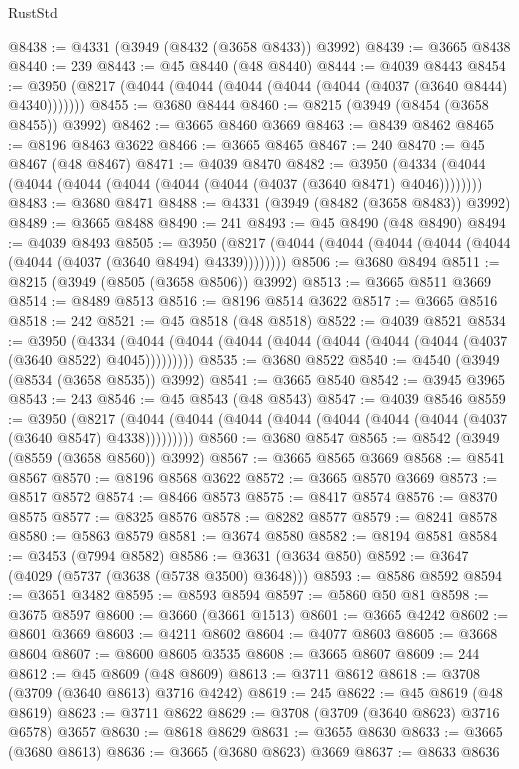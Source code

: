 \begin{lexlean}{RustStd}
\begin{coremodule}
@8438 := @4331 (@3949 (@8432 (@3658 @8433)) @3992)
@8439 := @3665 @8438
@8440 := 239
@8443 := @45 @8440 (@48 @8440)
@8444 := @4039 @8443
@8454 := @3950 (@8217 (@4044 (@4044 (@4044 (@4044 (@4044 (@4037 (@3640 @8444) @4340)))))))
@8455 := @3680 @8444
@8460 := @8215 (@3949 (@8454 (@3658 @8455)) @3992)
@8462 := @3665 @8460 @3669
@8463 := @8439 @8462
@8465 := @8196 @8463 @3622
@8466 := @3665 @8465
@8467 := 240
@8470 := @45 @8467 (@48 @8467)
@8471 := @4039 @8470
@8482 := @3950 (@4334 (@4044 (@4044 (@4044 (@4044 (@4044 (@4044 (@4037 (@3640 @8471) @4046))))))))
@8483 := @3680 @8471
@8488 := @4331 (@3949 (@8482 (@3658 @8483)) @3992)
@8489 := @3665 @8488
@8490 := 241
@8493 := @45 @8490 (@48 @8490)
@8494 := @4039 @8493
@8505 := @3950 (@8217 (@4044 (@4044 (@4044 (@4044 (@4044 (@4044 (@4037 (@3640 @8494) @4339))))))))
@8506 := @3680 @8494
@8511 := @8215 (@3949 (@8505 (@3658 @8506)) @3992)
@8513 := @3665 @8511 @3669
@8514 := @8489 @8513
@8516 := @8196 @8514 @3622
@8517 := @3665 @8516
@8518 := 242
@8521 := @45 @8518 (@48 @8518)
@8522 := @4039 @8521
@8534 := @3950
    (@4334 (@4044 (@4044 (@4044 (@4044 (@4044 (@4044 (@4044 (@4037 (@3640 @8522) @4045)))))))))
@8535 := @3680 @8522
@8540 := @4540 (@3949 (@8534 (@3658 @8535)) @3992)
@8541 := @3665 @8540
@8542 := @3945 @3965
@8543 := 243
@8546 := @45 @8543 (@48 @8543)
@8547 := @4039 @8546
@8559 := @3950
    (@8217 (@4044 (@4044 (@4044 (@4044 (@4044 (@4044 (@4044 (@4037 (@3640 @8547) @4338)))))))))
@8560 := @3680 @8547
@8565 := @8542 (@3949 (@8559 (@3658 @8560)) @3992)
@8567 := @3665 @8565 @3669
@8568 := @8541 @8567
@8570 := @8196 @8568 @3622
@8572 := @3665 @8570 @3669
@8573 := @8517 @8572
@8574 := @8466 @8573
@8575 := @8417 @8574
@8576 := @8370 @8575
@8577 := @8325 @8576
@8578 := @8282 @8577
@8579 := @8241 @8578
@8580 := @5863 @8579
@8581 := @3674 @8580
@8582 := @8194 @8581
@8584 := @3453 (@7994 @8582)
@8586 := @3631 (@3634 @850)
@8592 := @3647 (@4029 (@5737 (@3638 (@5738 @3500) @3648)))
@8593 := @8586 @8592
@8594 := @3651 @3482
@8595 := @8593 @8594
@8597 := @5860 @50 @81
@8598 := @3675 @8597
@8600 := @3660 (@3661 @1513)
@8601 := @3665 @4242
@8602 := @8601 @3669
@8603 := @4211 @8602
@8604 := @4077 @8603
@8605 := @3668 @8604
@8607 := @8600 @8605 @3535
@8608 := @3665 @8607
@8609 := 244
@8612 := @45 @8609 (@48 @8609)
@8613 := @3711 @8612
@8618 := @3708 (@3709 (@3640 @8613) @3716 @4242)
@8619 := 245
@8622 := @45 @8619 (@48 @8619)
@8623 := @3711 @8622
@8629 := @3708 (@3709 (@3640 @8623) @3716 @6578) @3657
@8630 := @8618 @8629
@8631 := @3655 @8630
@8633 := @3665 (@3680 @8613)
@8636 := @3665 (@3680 @8623) @3669
@8637 := @8633 @8636

\end{coremodule}
\end{lexlean}
